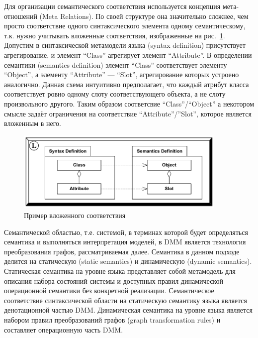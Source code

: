 \documentclass[a5paper]{article}
\begin{document}
Для организации семантического соответствия используется концепция мета-отношений (Meta Relations). По своей структуре она значительно сложнее, чем просто соответствие одного синтаксического элемента одному семантическому, т.к. нужно учитывать вложенные соответствия, изображенные на рис.~\ref{fig4}. Допустим в синтаксической метамодели языка (syntax definition) присутствует агрегирование, и элемент “Class” агрегирует элемент “Attribute”. В определении семантики (semantics definition) элемент “Class” соответствует элементу “Object”, а элементу “Attribute” --- “Slot”, агрегирование которых устроено аналогично. Данная схема интуитивно предполагает, что каждый атрибут класса соответствует ровно одному слоту соответствующего объекта, а не слоту произвольного другого. Таким образом соответсвие ``Class''/``Object'' а некотором смысле задаёт ограничения на соответствие “Attribute”/”Slot”, которое является вложенным в него.

\begin{figure} [ht]
  \begin{center}
    \includegraphics[width=0.9\textwidth]{dmm-metarelations.png}
    \caption{Пример вложенного соответствия}
    \label{fig4}
  \end{center}
\end{figure}

Семантической областью, т.е. системой, в терминах которой будет определяться семантика и выполняться интерпретация моделей, в DMM является технология преобразования графов, рассматриваемая далее. Семантика в данном подходе делится на статическую (static semantics) и динамическую (dynamic semantics). Статическая семантика на уровне языка представляет собой метамодель для описания набора состояний системы и доступных правил динамической операционной семантики без конкретной реализации. Семантическое соответствие синтаксической области на статическую семантику языка является денотационной частью DMM. Динамическая семантика на уровне языка является набором правил преобразований графов (graph transformation rules) и составляет операционную часть DMM.
\end{document}
